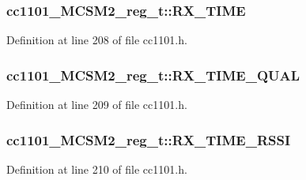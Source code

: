 \subsubsection[{\texorpdfstring{R\+X\+\_\+\+T\+I\+ME}{RX_TIME}}]{ cc1101\+\_\+\+M\+C\+S\+M2\+\_\+reg\+\_\+t\+::\+R\+X\+\_\+\+T\+I\+ME}\hypertarget{structcc1101___m_c_s_m2__reg__t_afabf6dd26f9b818d7c9aa369dbbe1132}{}\label{structcc1101___m_c_s_m2__reg__t_afabf6dd26f9b818d7c9aa369dbbe1132}


Definition at line 208 of file cc1101.\+h.

\subsubsection[{\texorpdfstring{R\+X\+\_\+\+T\+I\+M\+E\+\_\+\+Q\+U\+AL}{RX_TIME_QUAL}}]{ cc1101\+\_\+\+M\+C\+S\+M2\+\_\+reg\+\_\+t\+::\+R\+X\+\_\+\+T\+I\+M\+E\+\_\+\+Q\+U\+AL}\hypertarget{structcc1101___m_c_s_m2__reg__t_af2d45cdc6cf8147c64d76da028dde931}{}\label{structcc1101___m_c_s_m2__reg__t_af2d45cdc6cf8147c64d76da028dde931}


Definition at line 209 of file cc1101.\+h.

\subsubsection[{\texorpdfstring{R\+X\+\_\+\+T\+I\+M\+E\+\_\+\+R\+S\+SI}{RX_TIME_RSSI}}]{ cc1101\+\_\+\+M\+C\+S\+M2\+\_\+reg\+\_\+t\+::\+R\+X\+\_\+\+T\+I\+M\+E\+\_\+\+R\+S\+SI}\hypertarget{structcc1101___m_c_s_m2__reg__t_ae9a56d4de0edc27ccd9b969e6b784e9e}{}\label{structcc1101___m_c_s_m2__reg__t_ae9a56d4de0edc27ccd9b969e6b784e9e}


Definition at line 210 of file cc1101.\+h.

